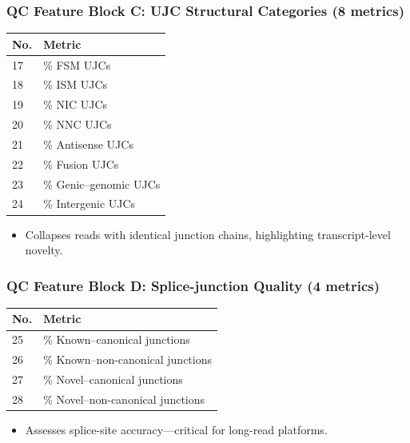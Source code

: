 \documentclass[aspectratio=169]{beamer}
\begin{document}
\begin{frame}
  \frametitle{QC Feature Block C: UJC Structural Categories (8 metrics)}
  \begin{table}[t]
    \centering
    \small
    \begin{tabular}{@{}ll@{}}
      \toprule
      No. & Metric \\
      \midrule
       17 & \% FSM UJCs \\
       18 & \% ISM UJCs \\
       19 & \% NIC UJCs \\
       20 & \% NNC UJCs \\
       21 & \% Antisense UJCs \\
       22 & \% Fusion UJCs \\
       23 & \% Genic–genomic UJCs \\
       24 & \% Intergenic UJCs \\
      \bottomrule
    \end{tabular}
  \end{table}
  \vspace{0.4em}
  \begin{itemize}
    \item Collapses reads with identical junction chains, highlighting transcript-level novelty.
  \end{itemize}
\end{frame}

\begin{frame}
  \frametitle{QC Feature Block D: Splice-junction Quality (4 metrics)}
  \begin{table}[t]
    \centering
    \small
    \begin{tabular}{@{}ll@{}}
      \toprule
      No. & Metric \\
      \midrule
       25 & \% Known–canonical junctions \\
       26 & \% Known–non-canonical junctions \\
       27 & \% Novel–canonical junctions \\
       28 & \% Novel–non-canonical junctions \\
      \bottomrule
    \end{tabular}
  \end{table}
  \vspace{0.4em}
  \begin{itemize}
    \item Assesses splice-site accuracy—critical for long-read platforms.
  \end{itemize}
\end{frame}
\end{document}
